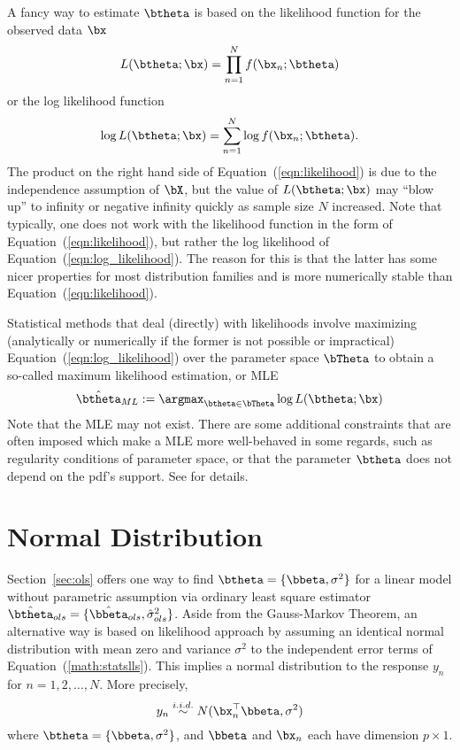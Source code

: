 A fancy way to estimate $\btheta$ is based on the
likelihood function for the observed data $\bx$
\begin{equation}
L(\btheta; \bx) = \prod_{n = 1}^N f(\bx_n; \btheta)
\label{eqn:likelihood}
\end{equation}
or the log likelihood function
\begin{equation}
\log L(\btheta; \bx) = \sum_{n = 1}^N \log f(\bx_n; \btheta).
\label{eqn:log_likelihood}
\end{equation}
The product on the right hand side of Equation~(\ref{eqn:likelihood}) is due to 
the independence assumption of $\bX$, but the value of $L(\btheta; \bx)$ may 
``blow up'' to infinity
or negative infinity quickly as sample size $N$ increased. Note that typically, 
one does not work with the likelihood function in the form of 
Equation~(\ref{eqn:likelihood}), but rather the log likelihood of
Equation~(\ref{eqn:log_likelihood}).  The reason for this is that the latter 
has some nicer properties for most distribution families and
is more numerically stable than Equation~(\ref{eqn:likelihood}).

Statistical methods that deal (directly) with likelihoods involve 
maximizing (analytically or numerically if the former is not possible or 
impractical) Equation~(\ref{eqn:log_likelihood})
over the parameter space $\bTheta$ to obtain a so-called maximum likelihood 
estimation, or MLE
$$
  \hat{\btheta}_{ML} := \argmax_{\btheta\in\bTheta} \log L(\btheta; \bx)
$$
Note that the MLE may not exist.  There 
are some additional constraints that are often imposed which make a MLE more 
well-behaved in some regards, such as regularity conditions of parameter space, 
or that the parameter $\btheta$ does not depend on the pdf's support.  See 
\citet{Casella2001} for details.




\section{Normal Distribution}
\label{sec:normal_distribution}

Section~\ref{sec:ols} offers one way to find
$\btheta = \{\bbeta,\sigma^2\}$ for a linear model
without parametric assumption via ordinary least square estimator
$\hat{\btheta}_{ols} = \{\hat{\bbeta}_{ols},\hat{\sigma}_{ols}^2\}$.
Aside from the Gauss-Markov Theorem,
an alternative way is based on likelihood approach by
assuming an identical normal distribution with mean zero and
variance $\sigma^2$ to the independent error terms of
Equation~(\ref{math:statslls}).
This implies a normal distribution
to the response $y_n$ for $n=1,2,\ldots, N$.  More precisely,
\begin{equation}
y_n \stackrel{i.i.d.}{\sim} N(\bx_n^\top\bbeta, \sigma^2)
\label{eqn:normal}
\end{equation}
where $\btheta = \{\bbeta, \sigma^2\}$, and
$\bbeta$ and $\bx_n$ each have dimension $p\times 1$.

